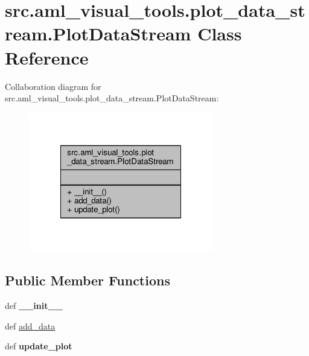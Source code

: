 \hypertarget{classsrc_1_1aml__visual__tools_1_1plot__data__stream_1_1_plot_data_stream}{\section{src.\-aml\-\_\-visual\-\_\-tools.\-plot\-\_\-data\-\_\-stream.\-Plot\-Data\-Stream Class Reference}
\label{classsrc_1_1aml__visual__tools_1_1plot__data__stream_1_1_plot_data_stream}
}


Collaboration diagram for src.\-aml\-\_\-visual\-\_\-tools.\-plot\-\_\-data\-\_\-stream.\-Plot\-Data\-Stream\-:\nopagebreak
\begin{figure}[H]
\begin{center}
\leavevmode
\includegraphics[width=228pt]{classsrc_1_1aml__visual__tools_1_1plot__data__stream_1_1_plot_data_stream__coll__graph}
\end{center}
\end{figure}
\subsection*{Public Member Functions}
\begin{DoxyCompactItemize}
\item 
\hypertarget{classsrc_1_1aml__visual__tools_1_1plot__data__stream_1_1_plot_data_stream_a5a8eddd028d2ef54c2ffda12565dfb81}{def {\bfseries \-\_\-\-\_\-init\-\_\-\-\_\-}}\label{classsrc_1_1aml__visual__tools_1_1plot__data__stream_1_1_plot_data_stream_a5a8eddd028d2ef54c2ffda12565dfb81}

\item 
def \hyperlink{classsrc_1_1aml__visual__tools_1_1plot__data__stream_1_1_plot_data_stream_afd3e833ff80674b87adcebe22ecdbcf4}{add\-\_\-data}
\item 
\hypertarget{classsrc_1_1aml__visual__tools_1_1plot__data__stream_1_1_plot_data_stream_a8187452774cc48a6cf08c1786b10985a}{def {\bfseries update\-\_\-plot}}\label{classsrc_1_1aml__visual__tools_1_1plot__data__stream_1_1_plot_data_stream_a8187452774cc48a6cf08c1786b10985a}

\end{DoxyCompactItemize}


